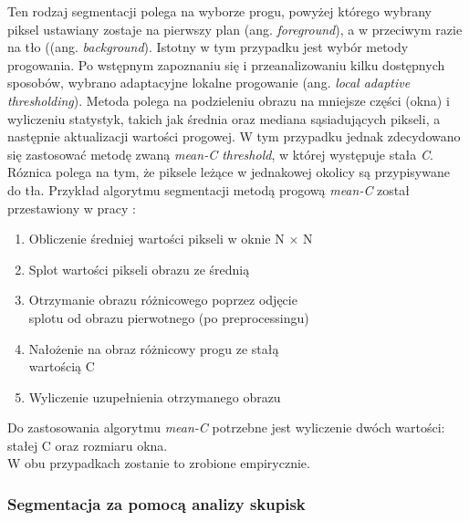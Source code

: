 \documentclass[conference]{IEEEtran}
\begin{document}
Ten rodzaj segmentacji polega na wyborze progu, powyżej którego wybrany piksel ustawiany zostaje na pierwszy plan (ang. \textit{foreground}), a w przeciwym razie na tło ((ang. \textit{background}). Istotny w tym przypadku jest wybór metody progowania. Po wstępnym zapoznaniu się i przeanalizowaniu kilku dostępnych sposobów, wybrano adaptacyjne lokalne progowanie (ang.  \textit{local adaptive thresholding}). Metoda polega na podzieleniu obrazu na mniejsze części (okna) i wyliczeniu statystyk, takich jak średnia oraz mediana sąsiadujących pikseli, a następnie aktualizacji wartości progowej. W tym przypadku jednak zdecydowano się zastosować metodę zwaną \textit{mean-C threshold}, w której występuje stała \textit{C}. Róznica polega na tym, że piksele leżące w jednakowej okolicy są przypisywane do tła. Przykład algorytmu segmentacji metodą progową \textit{mean-C} został przestawiony w pracy \cite{b7}:
\begin{enumerate}
\item Obliczenie średniej wartości pikseli w oknie N $\times$ N
\item Splot wartości pikseli obrazu ze średnią
\item Otrzymanie obrazu różnicowego poprzez odjęcie \\
splotu od obrazu pierwotnego (po preprocessingu)
\item Nałożenie na obraz różnicowy progu ze stałą \\
wartością C
\item Wyliczenie uzupełnienia otrzymanego obrazu
\end{enumerate}

Do zastosowania algorytmu \textit{mean-C} potrzebne jest wyliczenie dwóch wartości: stałej C oraz rozmiaru okna. \\
W obu przypadkach zostanie to zrobione empirycznie.\\


\subsubsection{Segmentacja za pomocą analizy skupisk}
\end{document}
